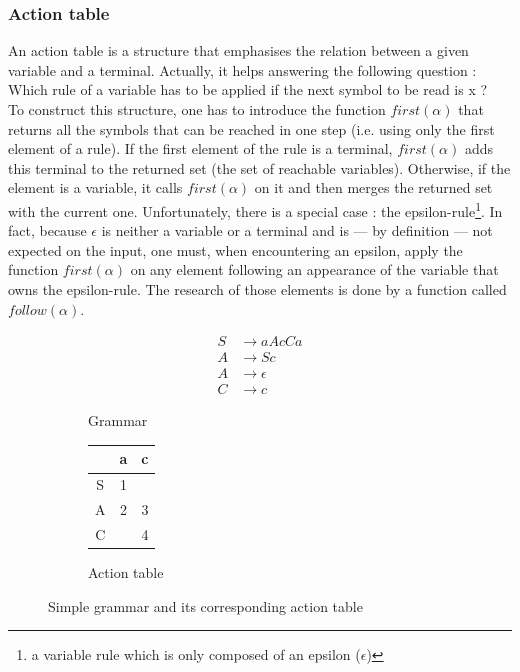 \documentclass[a4paper,11pt]{article}
\begin{document}
    \subsubsection{Action table}
      \label{subsubsec:actionTable}
      An action table is a structure that emphasises the relation between a given variable and a terminal. Actually, it helps answering the following question : Which rule of a variable has to be applied if the next symbol to be read is x ?\\
      To construct this structure, one has to introduce the function $first(\alpha)$ that returns all the symbols that can be reached in one step (i.e. using only the first element of a rule). If the first element of the rule is a terminal, $first(\alpha)$ adds this terminal to the returned set (the set of reachable variables). Otherwise, if the element is a variable, it calls $first(\alpha)$ on it and then merges the returned set with the current one. Unfortunately, there is a special case : the epsilon-rule\footnote{a variable rule which is only composed of an epsilon ($\epsilon$)}. In fact, because $\epsilon$ is neither a variable or a terminal and is --- by definition --- not expected on the input, one must, when encountering an epsilon, apply the function $first(\alpha)$ on any element following an appearance of the variable that owns the epsilon-rule. The research of those elements is done by a function called $follow(\alpha)$.
      \begin{figure}[h!]
        \centering
        \begin{subfigure}[b]{0.4\textwidth}
            \centering
            \begin{align}
              S &\rightarrow aAcCa \\
              A &\rightarrow Sc \\
              A &\rightarrow \epsilon \\
              C &\rightarrow c
            \end{align}
            \caption{Grammar}
            \label{fig:simplegrammar}
        \end{subfigure}
        \begin{subfigure}[b]{0.4\textwidth}
            \centering
            \begin{tabular}{|c||c|c|}
              \hline
                & a & c \\
              \hline
              \hline
              S & 1 &   \\
              \hline
              A & 2 & 3 \\
              \hline
              C &   & 4 \\
              \hline
            \end{tabular}
            \caption{Action table}
            \label{fig:simplegrammaractiontable}
        \end{subfigure}
        \caption{Simple grammar and its corresponding action table}
        \label{}
      \end{figure}
      
\end{document}
